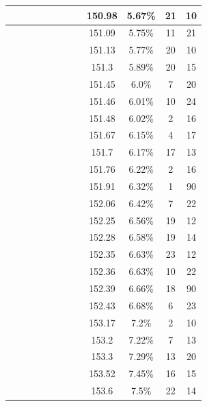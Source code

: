 \begin{center}
\begin{longtable}{|c|c|c|c|c|c|c|c|c|c|c|c|}
 \x &  \x &  &  &  &  \x &  &  \x & 150.98 & 5.67\% & 21 & 10 \\ \hline
 \x &  &  &  &  \x &  &  &  \x & 151.09 & 5.75\% & 11 & 21 \\ \hline
 \x &  &  \x &  \x &  &  &  &  & 151.13 & 5.77\% & 20 & 10 \\ \hline
 \x &  &  &  \x &  &  &  &  \x & 151.3 & 5.89\% & 20 & 15 \\ \hline
 \x &  \x &  &  \x &  &  \x &  &  \x & 151.45 & 6.0\% & 7 & 20 \\ \hline
 \x &  \x &  \x &  \x &  \x &  \x &  &  & 151.46 & 6.01\% & 10 & 24 \\ \hline
 \x &  \x &  &  &  \x &  \x &  \x &  \x & 151.48 & 6.02\% & 2 & 16 \\ \hline
 \x &  \x &  &  \x &  \x &  \x &  \x &  \x & 151.67 & 6.15\% & 4 & 17 \\ \hline
 \x &  &  \x &  \x &  &  &  &  \x & 151.7 & 6.17\% & 17 & 13 \\ \hline
 \x &  &  \x &  \x &  \x &  \x &  \x &  \x & 151.76 & 6.22\% & 2 & 16 \\ \hline
 \x &  &  \x &  \x &  \x &  \x &  &  \x & 151.91 & 6.32\% & 1 & 90 \\ \hline
 \x &  &  \x &  \x &  &  \x &  \x &  \x & 152.06 & 6.42\% & 7 & 22 \\ \hline
 \x &  \x &  &  &  \x &  &  &  & 152.25 & 6.56\% & 19 & 12 \\ \hline
 \x &  &  &  &  \x &  \x &  &  \x & 152.28 & 6.58\% & 19 & 14 \\ \hline
 \x &  \x &  &  \x &  &  &  &  \x & 152.35 & 6.63\% & 23 & 12 \\ \hline
 \x &  \x &  &  &  &  \x &  \x &  & 152.36 & 6.63\% & 10 & 22 \\ \hline
 \x &  \x &  \x &  \x &  \x &  &  \x &  \x & 152.39 & 6.66\% & 18 & 90 \\ \hline
 \x &  &  &  \x &  \x &  \x &  &  \x & 152.43 & 6.68\% & 6 & 23 \\ \hline
 \x &  \x &  &  &  \x &  \x &  &  & 153.17 & 7.2\% & 2 & 10 \\ \hline
 \x &  \x &  \x &  &  &  &  \x &  & 153.2 & 7.22\% & 7 & 13 \\ \hline
 \x &  &  \x &  \x &  \x &  &  \x &  \x & 153.3 & 7.29\% & 13 & 20 \\ \hline
 \x &  &  \x &  \x &  &  &  \x &  & 153.52 & 7.45\% & 16 & 15 \\ \hline
 \x &  &  &  \x &  &  &  &  & 153.6 & 7.5\% & 22 & 14 \\ \hline

\end{longtable}
\end{center}
